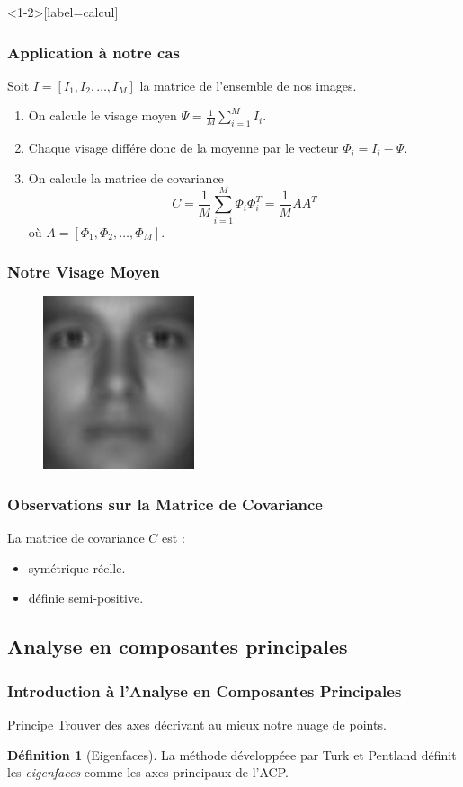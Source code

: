 \documentclass{beamer}
\theoremstyle{plain}
\theoremstyle{definition}
\newtheorem{defi}{Définition}
\begin{document}
\begin{frame}<1-2>[label=calcul]
  \frametitle{Application à notre cas}
  Soit $I = [I_1,I_2,\dotsc,I_M]$ la matrice de l'ensemble de nos images.
  \begin{enumerate}
  \item<2-> On calcule le visage moyen $\Psi = \frac{1}{M}\displaystyle\sum_{i=1}^{M} I_i$.        
  \item<3-> Chaque visage différe donc de la moyenne par le vecteur $\Phi_i = I_i - \Psi$.
  \item<4-> On calcule la matrice de covariance
    \[
      C = \frac{1}{M} \displaystyle\sum_{i=1}^{M} \Phi_i \Phi_i^T = \frac{1}{M} AA^T 
    \]
    où $A = [\Phi_1,\Phi_2,\dotsc,\Phi_M]$.
  \end{enumerate}
\end{frame}

\begin{frame}
  \frametitle{Notre Visage Moyen}
  \begin{figure}
    \includegraphics{src/beamer/figures/mean.jpg}
  \end{figure}
\end{frame}





\begin{frame}
  \frametitle{Observations sur la Matrice de Covariance}
  La matrice de covariance $C$ est :
  \begin{itemize}
  \item<2-> symétrique réelle.
  \item<3-> définie semi-positive.
  \end{itemize}
\end{frame}



\subsection{Analyse en composantes principales}
\begin{frame}
  \frametitle{Introduction à l'Analyse en Composantes Principales}
  \begin{block}{Principe}
    Trouver des axes décrivant au mieux notre nuage de points.
  \end{block}
  \pause
  \begin{defi}[Eigenfaces]
    La méthode développéee par Turk et Pentland définit les \emph{eigenfaces} comme les axes principaux de l'ACP.
  \end{defi}
\end{frame}
\end{document}
